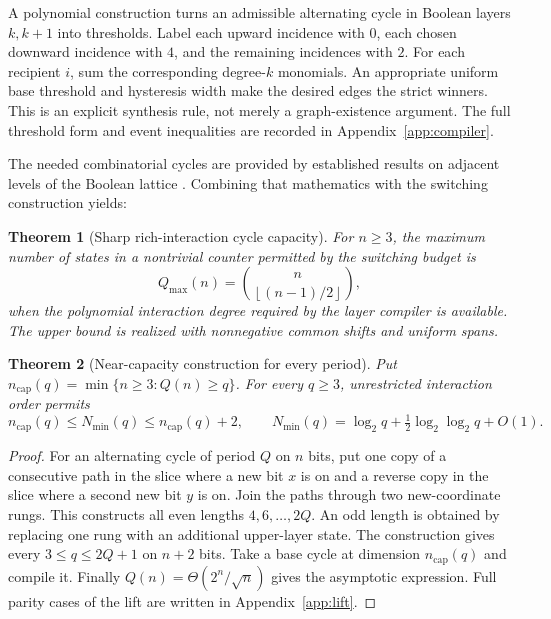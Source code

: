 \documentclass[12pt,letterpaper]{article}
\newtheorem{theorem}{Theorem}[section]
\theoremstyle{definition}\newtheorem{definition}[theorem]{Definition}
\theoremstyle{remark}\newtheorem{remark}[theorem]{Remark}
\newcommand{\Nmin}{N_{\min}}
\newcommand{\floor}[1]{\left\lfloor #1\right\rfloor}
\begin{document}
A polynomial construction turns an admissible alternating cycle in Boolean layers $k,k+1$ into thresholds. Label each upward incidence with $0$, each chosen downward incidence with $4$, and the remaining incidences with $2$. For each recipient $i$, sum the corresponding degree-$k$ monomials. An appropriate uniform base threshold and hysteresis width make the desired edges the strict winners. This is an explicit synthesis rule, not merely a graph-existence argument. The full threshold form and event inequalities are recorded in Appendix~\ref{app:compiler}.

The needed combinatorial cycles are provided by established results on adjacent levels of the Boolean lattice \citep{mutzesu2017,mutze2016}. Combining that mathematics with the switching construction yields:
\begin{theorem}[Sharp rich-interaction cycle capacity]\label{thm:capacity}
For $n\ge3$, the maximum number of states in a nontrivial counter permitted by the switching budget is
\begin{equation}\label{eq:sharp}
 Q_{\max}(n)=\binom{n}{\floor{(n-1)/2}},
\end{equation}
when the polynomial interaction degree required by the layer compiler is available. The upper bound is realized with nonnegative common shifts and uniform spans.
\end{theorem}

\begin{theorem}[Near-capacity construction for every period]\label{thm:everyperiod}
Put $n_{\mathrm{cap}}(q)=\min\{n\ge3:Q(n)\ge q\}$. For every $q\ge3$, unrestricted interaction order permits
\begin{equation}\label{eq:nearc}
 n_{\mathrm{cap}}(q)\le\Nmin(q)\le n_{\mathrm{cap}}(q)+2,\qquad
 \Nmin(q)=\log_2 q+\tfrac12\log_2\log_2 q+O(1).
\end{equation}
\end{theorem}
\begin{proof}
For an alternating cycle of period $Q$ on $n$ bits, put one copy of a consecutive path in the slice where a new bit $x$ is on and a reverse copy in the slice where a second new bit $y$ is on. Join the paths through two new-coordinate rungs. This constructs all even lengths $4,6,\ldots,2Q$. An odd length is obtained by replacing one rung with an additional upper-layer state. The construction gives every $3\le q\le2Q+1$ on $n+2$ bits. Take a base cycle at dimension $n_{\mathrm{cap}}(q)$ and compile it. Finally $Q(n)=\Theta(2^n/\sqrt n)$ gives the asymptotic expression. Full parity cases of the lift are written in Appendix~\ref{app:lift}.
\end{proof}
\end{document}
